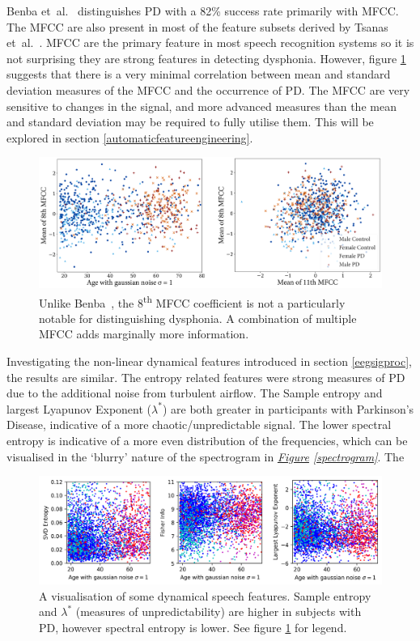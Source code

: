 \documentclass[12pt, twoside]{book}
\begin{document}
Benba et~al.~\cite{benba2014mfcc} distinguishes PD with a 82\% success rate primarily with MFCC. The MFCC are also present in most of the feature subsets derived by Tsanas et~al.~\cite{tsanas2012novel}. MFCC are the primary feature in most speech recognition systems so it is not surprising they are strong features in detecting dysphonia. However, figure \ref{mfcc_feat} suggests that there is a very minimal correlation between mean and standard deviation measures of the MFCC and the occurrence of PD. The MFCC are very sensitive to changes in the signal, and more advanced measures than the mean and standard deviation may be required to fully utilise them. This will be explored in section \ref{automaticfeatureengineering}.


\begin{figure}[h]
	\caption{Unlike Benba~\cite{benba2014mfcc}, the 8\textsuperscript{th} MFCC coefficient is not a particularly notable for distinguishing dysphonia. A combination of multiple MFCC adds marginally more information. }
	\label{mfcc_feat}
	\centering\includegraphics[width=1\linewidth]{mfcc_feat.png}
\end{figure}


Investigating the non-linear dynamical features introduced in section \ref{eegsigproc}, the results are similar. The entropy related features were  strong measures of PD due to the additional noise from turbulent airflow. The Sample entropy and largest Lyapunov Exponent ($\lambda^*$)  are both greater in participants with Parkinson's Disease, indicative of a more chaotic/unpredictable signal. The lower spectral entropy is indicative of a more even distribution of the frequencies, which can be visualised in the `blurry' nature of the spectrogram in \textit{\hyperref[spectrogram]{Figure} \ref{spectrogram}}. The  



\begin{figure}[h]
	\centering
	\centerline{
		\includegraphics[width=1.15\linewidth]{speech_dynamic.png}
	}
	\caption{A visualisation of some dynamical speech features. Sample entropy and $\lambda^*$ (measures of unpredictability) are higher in subjects with PD, however spectral entropy is lower. See figure \ref{mfcc_feat} for legend.}
	\label{speechdynamic}
\end{figure}
\end{document}
